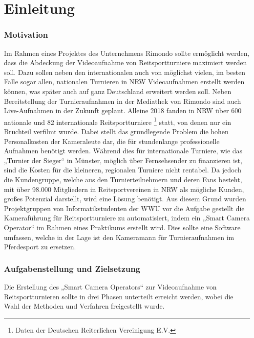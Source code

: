 \chapter{Einleitung}


\subsection*{Motivation}

Im Rahmen eines Projektes des Unternehmens Rimondo sollte ermöglicht werden, dass die Abdeckung der Videoaufnahme von Reitsportturniere maximiert werden soll. Dazu sollen neben den internationalen auch von möglichst vielen, im besten Falle sogar allen, nationalen Turnieren in NRW Videoaufnahmen erstellt werden können, was später auch auf ganz Deutschland erweitert werden soll. Neben Bereitstellung der Turnieraufnahmen in der Mediathek von Rimondo sind auch Live-Aufnahmen in der Zukunft geplant. Alleine 2018 fanden in NRW über 600 nationale und 82 internationale Reitsportturniere \footnote{Daten der Deutschen Reiterlichen Vereinigung E.V.} statt, von denen nur ein Bruchteil verfilmt wurde.
Dabei stellt das grundlegende Problem die hohen Personalkosten der Kameraleute dar, die für stundenlange professionelle Aufnahmen benötigt werden. Während dies für internationale Turniere, wie das „Turnier der Sieger“ in Münster, möglich über Fernsehsender zu finanzieren ist, sind die Kosten für die kleineren, regionalen Turniere nicht rentabel. Da jedoch die Kundengruppe, welche aus den Turnierteilnehmern und deren Fans besteht, mit über 98.000 Mitgliedern in Reitsportvereinen in NRW als mögliche Kunden, großes Potenzial darstellt, wird eine Lösung benötigt. Aus diesem Grund wurden Projektgruppen von Informatikstudenten der WWU vor die Aufgabe gestellt die Kameraführung für Reitsportturniere zu automatisiert, indem ein „Smart Camera Operator“ im Rahmen eines Praktikums erstellt wird. Dies sollte eine Software umfassen, welche in der Lage ist den Kameramann für Turnieraufnahmen im Pferdesport zu ersetzen.



\subsection*{Aufgabenstellung und Zielsetzung}

Die Erstellung des „Smart Camera Operators“ zur Videoaufnahme von Reitsportturnieren sollte in drei Phasen unterteilt erreicht werden, wobei die Wahl der Methoden und Verfahren freigestellt wurde.

